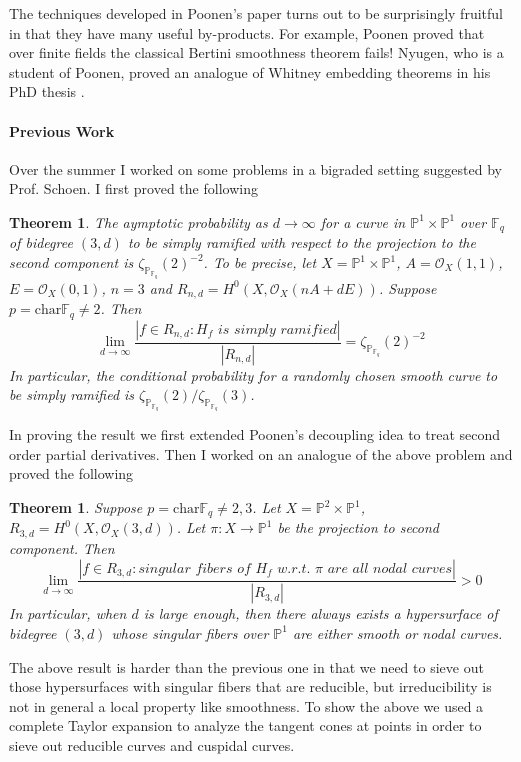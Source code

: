 \documentclass[12pt]{article}
\theoremstyle{plain}
\newtheorem{theorem}[equation]{Theorem}
\theoremstyle{definition}
\newcommand{\IF}{\mathbb{F}}
\newcommand{\IP}{\mathbb{P}}
\newcommand{\sO}{\mathcal{O}}
\newcommand{\<}{\langle}
\renewcommand{\>}{\rangle}
\begin{document}
The techniques developed in Poonen's paper \cite{PBertini} turns out to be surprisingly fruitful in that they have many useful by-products. For example, Poonen proved that over finite fields the classical Bertini smoothness theorem fails! Nyugen, who is a student of Poonen, proved an analogue of Whitney embedding theorems in his PhD thesis \cite{Nyugen}. 

\paragraph{Previous Work}
Over the summer I worked on some problems in a bigraded setting suggested by Prof. Schoen. I first proved the following
\begin{theorem}
The aymptotic probability as $d \to \infty$ for a curve in $\IP^1 \times \IP^1$ over $\IF_q$ of bidegree $(3, d)$ to be simply ramified with respect to the projection to the second component is $\zeta_{\IP_{\IF_q}}(2)^{-2}$. To be precise, let $X = \IP^1 \times \IP^1$, $A = \sO_X(1, 1)$, $E = \sO_X(0, 1)$, $n = 3$ and $R_{n,d} = H^0(X, \sO_X(nA + d E))$. Suppose $p = \mathrm{char } \IF_q \neq 2$. Then 
$$\lim_{d \to \infty} \frac{|f \in R_{n, d} : H_f \textit{ is simply ramified}|}{|R_{n,d}|} = \zeta_{\IP_{\IF_q}}(2)^{-2} $$ In particular, the conditional probability for a randomly chosen smooth curve to be simply ramified is $\zeta_{\IP_{\IF_q}}(2)/\zeta_{\IP_{\IF_q}}(3)$. 
\end{theorem}
In proving the result we first extended Poonen's decoupling idea to treat second order partial derivatives. Then I worked on an analogue of the above problem and proved the following 
\begin{theorem}
Suppose $p = \mathrm{char } \IF_q \neq 2, 3$. Let $X = \IP^2 \times \IP^1$, $R_{3,d} = H^0(X, \sO_X(3, d))$. Let $\pi : X \to \IP^1$ be the projection to second component. Then 
$$\lim_{d \to \infty} \frac{|f \in R_{3, d} : \textit{singular fibers of } H_f \textit{ w.r.t. $\pi$ are all nodal curves}|}{|R_{3,d}|} > 0 $$ 
In particular, when $d$ is large enough, then there always exists a hypersurface of bidegree $(3, d)$ whose singular fibers over $\IP^1$ are either smooth or nodal curves. 
\end{theorem}
The above result is harder than the previous one in that we need to sieve out those hypersurfaces with singular fibers that are reducible, but irreducibility is not in general a local property like smoothness. To show the above we used a complete Taylor expansion to analyze the tangent cones at points in order to sieve out reducible curves and cuspidal curves. 
\end{document}
